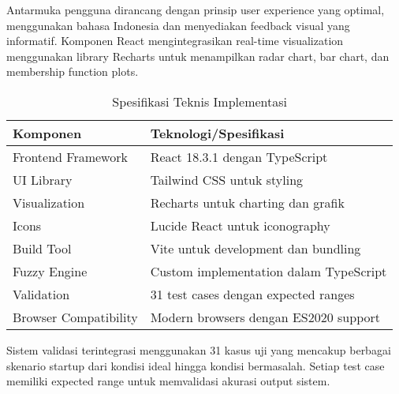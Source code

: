 \documentclass[12pt,a4paper]{article}
\begin{document}
Antarmuka pengguna dirancang dengan prinsip user experience yang optimal, menggunakan bahasa Indonesia dan menyediakan feedback visual yang informatif. Komponen React mengintegrasikan real-time visualization menggunakan library Recharts untuk menampilkan radar chart, bar chart, dan membership function plots.

\begin{table}[htbp] %
\centering
\caption{Spesifikasi Teknis Implementasi}
\label{tab:tech-specs}
\begin{tabular}{@{}ll@{}}
\toprule
\textbf{Komponen} & \textbf{Teknologi/Spesifikasi} \\
\midrule
Frontend Framework & React 18.3.1 dengan TypeScript \\
UI Library & Tailwind CSS untuk styling \\
Visualization & Recharts untuk charting dan grafik \\
Icons & Lucide React untuk iconography \\
Build Tool & Vite untuk development dan bundling \\
Fuzzy Engine & Custom implementation dalam TypeScript \\
Validation & 31 test cases dengan expected ranges \\
Browser Compatibility & Modern browsers dengan ES2020 support \\
\bottomrule
\end{tabular}
\end{table}

Sistem validasi terintegrasi menggunakan 31 kasus uji yang mencakup berbagai skenario startup dari kondisi ideal hingga kondisi bermasalah. Setiap test case memiliki expected range untuk memvalidasi akurasi output sistem.
\end{document}
